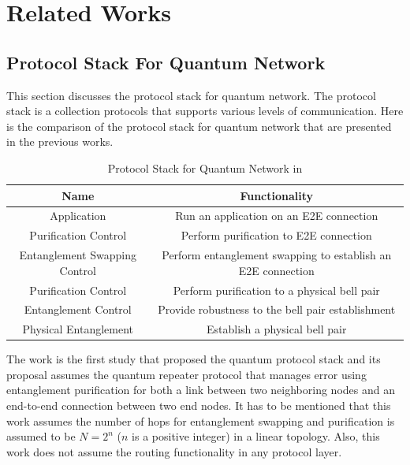 \chapter{Related Works}
\label{related works}

\section{Protocol Stack For Quantum Network}

This section discusses the protocol stack for quantum network. The protocol stack is a collection protocols that supports various levels of communication.
Here is the comparison of the protocol stack for quantum network that are presented in the previous works.

\begin{table}[ht]
  \begin{center}
    \begin{tabular}{|c|c|} \hline
       Name & Functionality \\ \hline \cline{1-2}
       Application & Run an application on an E2E connection \\ \hline \cline{1-2}
       Purification Control & Perform purification to E2E connection \\ \hline \cline{1-2}
       Entanglement Swapping Control & Perform entanglement swapping to establish an E2E connection \\
       Purification Control & Perform purification to a physical bell pair \\ \hline \cline{1-2} \hline \cline{1-2}
       Entanglement Control & Provide robustness to the bell pair establishment \\ \hline \cline{1-2} \hline \cline{1-2}
       Physical Entanglement & Establish a physical bell pair \\ \hline \cline{1-2} \hline \cline{1-2}
    \end{tabular}
    \caption{Protocol Stack for Quantum Network in \cite{Van_Meter_2009}}
  \end{center}
\end{table}

The work \cite{Van_Meter_2009} is the first study that proposed the quantum protocol stack and its proposal assumes the quantum repeater protocol that manages error using entanglement purification for both a link between two neighboring nodes and an end-to-end connection between two end nodes.
It has to be mentioned that this work assumes the number of hops for entanglement swapping and purification is assumed to be $N = 2^n$ ($n$ is a positive integer) in a linear topology. Also, this work does not assume the routing functionality in any protocol layer.

